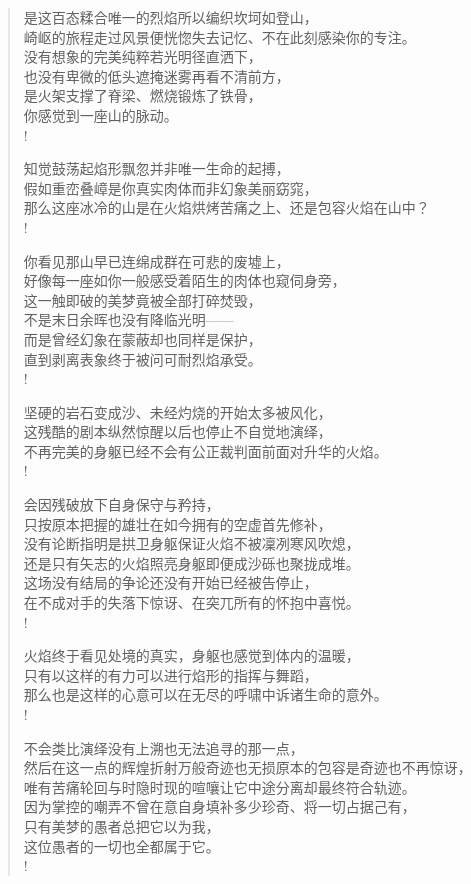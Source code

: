 \documentclass[UTF8, 12pt, a4paper]{ctexrep} %
\begin{document}
\begin{verse}
是这百态糅合唯一的烈焰所以编织坎坷如登山，\\
崎岖的旅程走过风景便恍惚失去记忆、不在此刻感染你的专注。\\
没有想象的完美纯粹若光明径直洒下，\\
也没有卑微的低头遮掩迷雾再看不清前方，\\
是火架支撑了脊梁、燃烧锻炼了铁骨，\\
你感觉到一座山的脉动。\\!

知觉鼓荡起焰形飘忽并非唯一生命的起搏，\\
假如重峦叠嶂是你真实肉体而非幻象美丽窈窕，\\
那么这座冰冷的山是在火焰烘烤苦痛之上、还是包容火焰在山中？\\!

你看见那山早已连绵成群在可悲的废墟上，\\
好像每一座如你一般感受着陌生的肉体也窥伺身旁，\\
这一触即破的美梦竟被全部打碎焚毁，\\
不是末日余晖也没有降临光明——\\
而是曾经幻象在蒙蔽却也同样是保护，\\
直到剥离表象终于被问可耐烈焰承受。\\!

坚硬的岩石变成沙、未经灼烧的开始太多被风化，\\
这残酷的剧本纵然惊醒以后也停止不自觉地演绎，\\
不再完美的身躯已经不会有公正裁判面前面对升华的火焰。\\!

会因残破放下自身保守与矜持，\\
只按原本把握的雄壮在如今拥有的空虚首先修补，\\
没有论断指明是拱卫身躯保证火焰不被凜冽寒风吹熄，\\
还是只有矢志的火焰照亮身躯即便成沙砾也聚拢成堆。\\
这场没有结局的争论还没有开始已经被告停止，\\
在不成对手的失落下惊讶、在突兀所有的怀抱中喜悦。\\!

火焰终于看见处境的真实，身躯也感觉到体内的温暖，\\
只有以这样的有力可以进行焰形的指挥与舞蹈，\\
那么也是这样的心意可以在无尽的呼啸中诉诸生命的意外。\\!

不会类比演绎没有上溯也无法追寻的那一点，\\
然后在这一点的辉煌折射万般奇迹也无损原本的包容是奇迹也不再惊讶，\\
唯有苦痛轮回与时隐时现的喧嚷让它中途分离却最终符合轨迹。\\
因为掌控的嘲弄不曾在意自身填补多少珍奇、将一切占据己有，\\
只有美梦的愚者总把它以为我，\\
这位愚者的一切也全都属于它。\\!


\end{verse}
\end{document}
